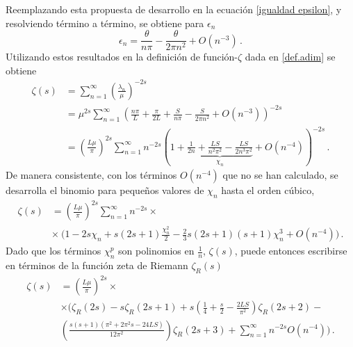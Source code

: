 Reemplazando esta propuesta de desarrollo en la ecuación \eqref{igualdad epsilon}, y resolviendo término a término, se obtiene para $\epsilon _n $
\begin{equation}
    \epsilon _n = \frac{\theta}{n \pi} 
     - \frac{ \theta}{2 \pi n ^2 } + O \left( n ^{-3}\right) 
     \, .
\label{epsilons}
\end{equation}
Utilizando estos resultados en la definición de función-$\zeta$ dada en \eqref{def.adim} se obtiene
\begin{align}
\nonumber
    \zeta  (s) &=  
    \sum _{n=1} ^{\infty} 
    \left( \frac{\lambda _n }{\mu } 
    	\right) ^ {- 2s}  \\
&=
\label{eq.abajo.chi}
    \mu ^{2s} \sum _{n=1} ^{\infty} 
    \left(
	\frac{n \pi}{L } + 
    \frac{\pi}{2 L } +
    \frac{S}{n \pi } -
    \frac{S}{2 \pi n ^2   } +
    O \left(  n^{-3} \right) 
    \right) ^{-2 s}  \\[5pt]    
&= 
\nonumber
	\left( \frac{L \mu }{\pi} \right) ^{2s}    
    \sum _{n=1} ^{\infty} 
    n ^{- 2 s} 
    \left(
    1 +     
    \underbrace{
        \frac{1}{2 n} + 
        \frac{L S}{n^2 \pi ^2} -
        \frac{L S}{2 n ^3 \pi ^2} } 
        _{ \chi _n} +
        O \left(n ^{-4} \right)  
    \right ) ^{-2 s}
    \, .
\end{align}
De manera consistente, con los términos  $ O (n ^{-4})$ que no se han calculado, se desarrolla  el binomio para pequeños valores de $\chi _n$ hasta el orden cúbico,
\begin{align}
\label{eq.auxiliar2}
\zeta  (s) &= 
\left( \frac{L \mu }{\pi} \right) ^{2 s}
\sum _{n=1} ^{\infty}
  n  ^{-2 s} \times \\[5pt]
& \times   \ \Bigg(
	1 - 
	2 s \chi _n +  s(2s+1) \frac{\chi _n ^2}{2} - 
	\frac{2}{3} s(2s+1)(s+1) \chi _n ^3  + O \left( n ^{-4} \right) \Bigg)
	\, .
	\nonumber
\end{align}
Dado que los términos $\chi _n ^p$ son polinomios en $\frac{1}{n}$, $\zeta(s)$, puede entonces escribirse en términos de la función zeta de Riemann $\zeta _R (s)$
\begin{align}
    \zeta  (s) &= \left( \frac{L \mu }{\pi} \right) ^{2s} \times 
\\[5pt]
\nonumber
&
\times
	 \Bigg(
		\zeta _R ( 2 s ) -
		s \zeta _R ( 2s+1 ) +
		 s \left( \frac{1}{4} + \frac{s}{2} - \frac{2 L  S}{\pi ^2} \right) \zeta _R (2s +2 ) - \\[5pt]
\nonumber
		 &  \left(  
					\frac{s(s+1) ( \pi ^2 + 2 \pi ^2 s - 24 L S)}{12 \pi ^2 }
		 			\right) \zeta _R (2s+3)
		+ \sum _{n=1} ^{\infty} n ^{-2s} O ( n ^{-4})
		\Bigg)
		\, .
\end{align} 
